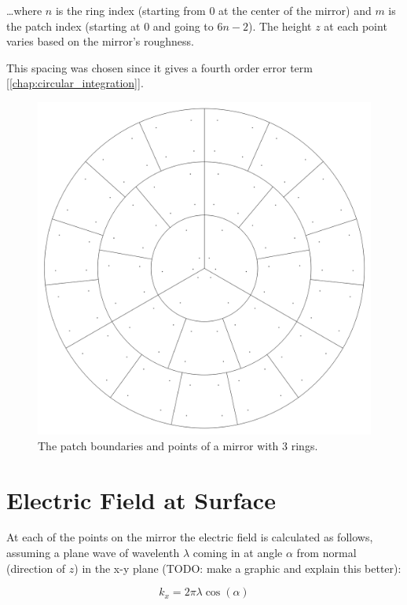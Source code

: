 \documentclass[etd,twoside,senior]{BYUPhys}
\begin{document}
\ldots where $n$ is the ring index (starting from 0 at the center of the mirror) and $m$ is the patch index (starting at 0 and going to $6n-2$). The height $z$ at each point varies based on the mirror's roughness.

This spacing was chosen since it gives a fourth order error term [\ref{chap:circular_integration}].

\begin{figure}
  \centerline{\includegraphics[width=\textwidth]{circular-grid-with-points}}
  \caption[Mirror patch boundaries and point locations]{\label{fig:patches_points}
    The patch boundaries and points of a mirror with 3 rings.}
\end{figure}



\section{Electric Field at Surface}\label{chap:efield}

At each of the points on the mirror the electric field is calculated as follows, assuming a plane wave of wavelenth $\lambda$ coming in at angle $\alpha$ from normal (direction of $z$) in the x-y plane (TODO: make a graphic and explain this better):

\begin{equation}
  k_{x}=2\pi\lambda\cos\left(\alpha\right)
\end{equation}
\end{document}
